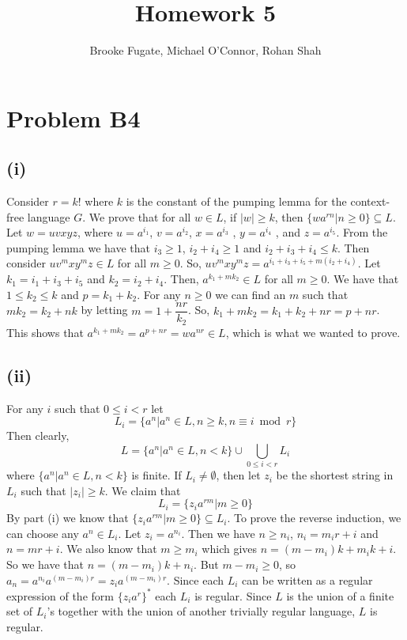 \documentclass[12pt]{article}
\begin{document}
\pagestyle{plain}
\titleformat{\subsection}[runin]
  {\normalfont\large\bfseries}{\thesubsection}{1em}{}

\title{Homework 5}
\author{Brooke Fugate, Michael O'Connor, Rohan Shah}
\date{}

\maketitle

\section*{Problem B4}

\subsection*{(i)} Consider $r = k!$ where $k$ is the constant of the pumping
lemma for the context-free language $G$. We prove that for all $w \in L$,
if $|w|\ge k$, then $\{wa^{rn} | n \ge 0 \} \subseteq L$. Let $w=uvxyz$, where
$u=a^{i_1}$, $v=a^{i_2}$, $x=a^{i_3}$ , $y=a^{i_4}$ , and $z=a^{i_5}$.
From the pumping lemma we have that $i_3 \ge 1$, $i_2 + i_4 \ge 1$ and
$i_2 + i_3 + i_4 \le k$. Then consider $uv^mxy^mz \in L$ for all $m \ge 0$.
So, $uv^mxy^mz = a^{i_1+i_3+i_5 + m(i_2 + i_4)}$. Let $k_1 = i_1 + i_3 + i_5$
and $k_2 = i_2 + i_4$. Then, $a^{k_1 + mk_2} \in L$ for all $m \ge 0$.
We have that $1 \le k_2 \le k$ and $p=k_1+k_2$. For any $n \ge 0$ we can find
an $m$ such that $mk_2=k_2 +nk$ by letting $m=1+ \dfrac{nr}{k_2}$. So,
$k_1+mk_2=k_1+k_2+nr=p+nr$. This shows that
$a^{k_1+mk_2}=a^{p+nr}=wa^{nr} \in L$, which is what we wanted to prove.

\subsection*{(ii)}
For any $i$ such that $0 \le i < r$ let
$$L_i = \{a^n |a^n \in L, n \ge k , n \equiv i \bmod r \}$$
Then clearly,
$$L = \{ a^n | a^n \in L , n < k\} \cup \bigcup_{0 \le i < r} L_i$$
where $\{ a^n | a^n \in L , n < k\}$ is finite.
If $L_i \neq \emptyset$, then let $z_i$ be the shortest string in $L_i$
such that $|z_i| \ge k$. We claim that
$$L_i = \{z_i a^{rm} | m \ge 0\}$$
By part (i) we know that $\{z_i a^{rm} | m \ge 0\} \subseteq L_i$.
To prove the reverse induction, we can choose any $a^n \in L_i$.
Let $z_i = a^{n_i}$. Then we have $n \ge n_i$, $n_i = m_ir + i$ and $n=mr +i$.
We also know that $m \ge m_i$ which gives $n=(m-m_i)k + m_ik + i$.
So we have that $n=(m-m_i)k + n_i$. But $m-m_i \ge 0$,
so $a_n=a^{n_i}a^{(m-m_i)r}=z_ia^{(m-m_i)r}$.
Since each $L_i$ can be written as a regular expression of the form
$\{z_ia^r\}^*$ each $L_i$ is regular. Since $L$ is the union of a finite set of
$L_i$'s together with the union of another trivially regular language,
$L$ is regular.
\end{document}

